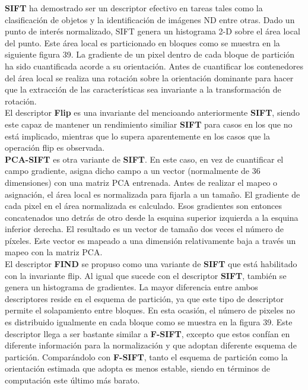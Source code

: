 \textbf{SIFT} ha demostrado ser un descriptor efectivo en tareas tales como la clasificación de objetos y la identificación de imágenes ND entre otras. Dado un punto de interés normalizado, SIFT genera un histograma 2-D sobre el área local del punto. Este área local es particionado en bloques como se muestra en la siguiente figura 39. La gradiente de un pixel dentro de cada bloque de partición ha sido cuantificada acorde a su orientación. Antes de cuantificar los contenedores del área local se realiza una rotación sobre la orientación dominante para hacer que la extracción de las características sea invariante a la transformación de rotación. \\

El descriptor \textbf{Flip} es una invariante del mencioando anteriormente \textbf{SIFT}, siendo este capaz de mantener un rendimiento similiar \textbf{SIFT} para casos en los que no está implicado, mientras que lo supera aparentemente en los casos que la operación flip es observada. \\

\textbf{PCA-SIFT} es otra variante de \textbf{SIFT}. En este caso, en vez de cuantificar el campo gradiente, asigna dicho campo a un vector (normalmente de 36 dimensiones) con una matriz PCA entrenada. Antes de realizar el mapeo o asignación, el área local es normalizada para fijarla a un tamaño. El gradiente de cada pixel en el área normalizada es calculado. Esos gradientes son entonces concatenados uno detrás de otro desde la esquina superior izquierda a la esquina inferior derecha. El resultado es un vector de tamaño dos veces el número de píxeles. Este vector es mapeado a una dimensión relativamente baja a través un mapeo con la matriz PCA. \\

El descriptor \textbf{FIND} se propuso como una variante de \textbf{SIFT } que está habilitado con la invariante flip. Al igual que sucede con el descriptor \textbf{SIFT}, también se genera un histograma de gradientes. La mayor diferencia entre ambos descriptores reside en el esquema de partición, ya que este tipo de descriptor permite el solapamiento entre bloques. En esta ocasión, el número de pixeles no es distribuido igualmente en cada bloque como se muestra en la figura 39. Este descriptor llega a ser bastante similar a \textbf{F-SIFT}, excepto que estos confían en diferente información para la normalización y que adoptan diferente esquema de partición. Comparándolo con \textbf{F-SIFT}, tanto el esquema de partición como la orientación estimada que adopta es menos estable, siendo en términos de computación este último más barato. \\

